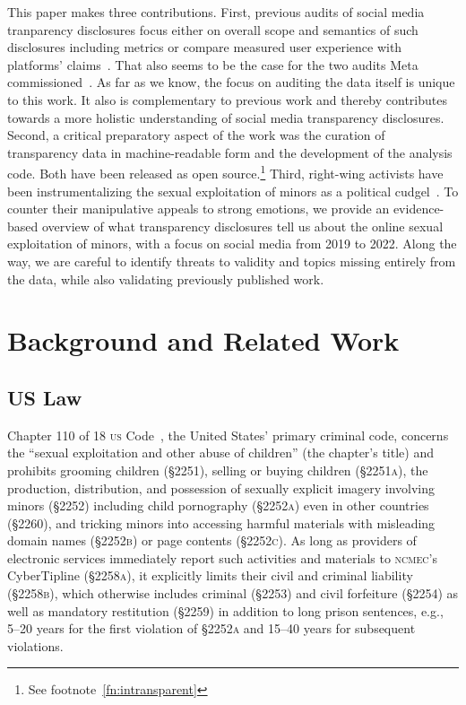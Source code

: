 \documentclass[nonacm,screen]{acmart}
\newcommand\V[1]{\textsc{\MakeLowercase{#1}}}
\begin{document}
\begin{itemize}
{This paper makes three contributions. First, previous audits of social media
tranparency disclosures focus either on overall scope and semantics of such
disclosures including metrics or compare measured user experience with
platforms' claims~\cite{AccessNow2021,CrockerGebhartea2019,Francoisdouek2021,
StoughtonRosenzweig2022,WagnerRozgonyiea2020}. That also seems to be the case
for the two audits Meta commissioned~\cite{BradfordGriselea2019,Meta2022,
Plumb2019,Sarang2022}. As far as we know, the focus on auditing the data itself
is unique to this work. It also is complementary to previous work and thereby
contributes towards a more holistic understanding of social media transparency
disclosures. Second, a critical preparatory aspect of the work was the curation
of transparency data in machine-readable form and the development of the
analysis code. Both have been released as open source.\footnote{See
footnote~\ref{fn:intransparent}} Third, right-wing activists have been
instrumentalizing the sexual exploitation of minors as a political
cudgel~\cite{BuntainBarlowea2022,Feffer2021,Gilbert2023, Romano2022}. To counter
their manipulative appeals to strong emotions, we provide an evidence-based
overview of what transparency disclosures tell us about the online sexual
exploitation of minors, with a focus on social media from 2019 to 2022. Along
the way, we are careful to identify threats to validity and topics missing
entirely from the data, while also validating previously published work.



\section{Background and Related Work}
\label{sec:background}

\subsection{US Law}

Chapter 110 of 18 \V{US} Code~\cite{Chapter110Code18US}, the United States'
primary criminal code, concerns the ``sexual exploitation and other abuse of
children'' (the chapter's title) and prohibits grooming children (\S2251),
selling or buying children (\V{\S2251A}), the production, distribution, and
possession of sexually explicit imagery involving minors (\S2252) including
child pornography (\V{\S2252A}) even in other countries (\S2260), and tricking
minors into accessing harmful materials with misleading domain names
(\V{\S2252B}) or page contents (\V{\S2252C}). As long as providers of electronic
services immediately report such activities and materials to \V{NCMEC}'s
CyberTipline (\V{\S2258A}), it explicitly limits their civil and criminal
liability (\V{\S2258B}), which otherwise includes criminal (\S2253) and civil
forfeiture (\S2254) as well as mandatory restitution (\S2259) in addition to
long prison sentences, e.g., 5--20 years for the first violation of \V{\S2252A}
and 15--40 years for subsequent violations.

}
\end{itemize}
\end{document}
